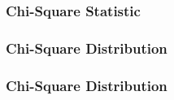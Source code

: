 \documentclass[handout]{beamer}
\newcommand{\blue}[1]{\textcolor{blue2}{#1}}
\begin{document}
\begin{frame}
\frametitle{Chi-Square Statistic}
%
%

\end{frame}


\begin{frame}
\frametitle{Chi-Square Distribution}
%
%
%

\end{frame}


\begin{frame}
\frametitle{Chi-Square Distribution}
%
%
%
%

\end{frame}
\end{document}
